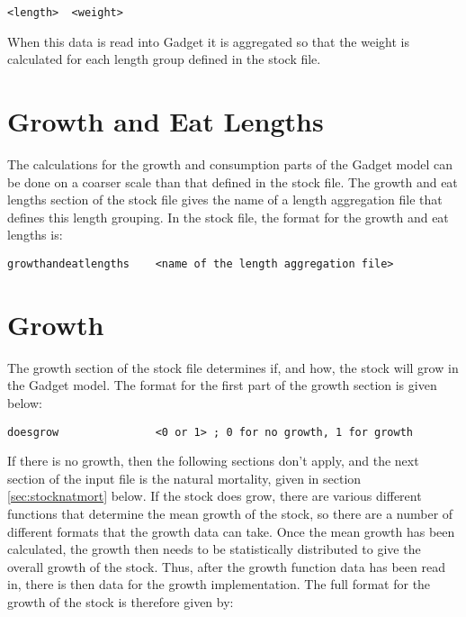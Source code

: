 \documentclass[]{book}
\begin{document}
\begin{verbatim}
<length>  <weight>
\end{verbatim}

When this data is read into Gadget it is aggregated so that the weight
is calculated for each length group defined in the stock file.

\hypertarget{sec:stockgrowthlength}{%
\section{Growth and Eat Lengths}\label{sec:stockgrowthlength}}

The calculations for the growth and consumption parts of the Gadget
model can be done on a coarser scale than that defined in the stock
file. The growth and eat lengths section of the stock file gives the
name of a length aggregation file that defines this length grouping. In
the stock file, the format for the growth and eat lengths is:

\begin{verbatim}
growthandeatlengths    <name of the length aggregation file>
\end{verbatim}

\hypertarget{sec:stockgrowth}{%
\section{Growth}\label{sec:stockgrowth}}

The growth section of the stock file determines if, and how, the stock
will grow in the Gadget model. The format for the first part of the
growth section is given below:

\begin{verbatim}
doesgrow               <0 or 1> ; 0 for no growth, 1 for growth
\end{verbatim}

If there is no growth, then the following sections don't apply, and the
next section of the input file is the natural mortality, given in
section \ref{sec:stocknatmort} below. If the stock does grow, there are
various different functions that determine the mean growth of the stock,
so there are a number of different formats that the growth data can
take. Once the mean growth has been calculated, the growth then needs to
be statistically distributed to give the overall growth of the stock.
Thus, after the growth function data has been read in, there is then
data for the growth implementation. The full format for the growth of
the stock is therefore given by:
\end{document}
